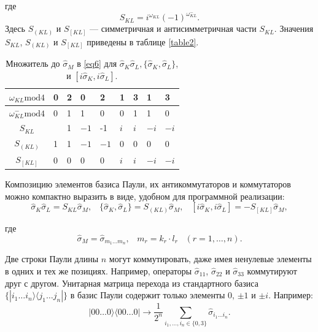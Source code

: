 \documentclass[a4paper]{report}
\begin{document}
где $$S_{KL} = i^{\omega_{KL}}(-1)^{\omega^-_{KL}}.$$
Здесь ${S_{(KL)}}$ и ${S_{[KL]}}$ — симметричная и антисимметричная части ${S_{KL}}$. Значения ${S_{KL}}$, ${S_{(KL)}}$ и ${S_{[KL]}}$ приведены в таблице \ref{table2}.

\begin{table}[h!]
    \centering
    \begin{tabular}{ | c | P{1cm} | P{1cm} | P{1cm} | P{1cm} | P{1cm} | P{1cm} | P{1cm} | P{1cm} | }
        \hline
        ${\omega_{KL}\mathrm{mod4}}$     & 0 & 2 & 0      & 2      & 1     & 3     & 1      & 3      \\
        \hline
        ${\omega_{KL}^{-}\mathrm{mod4}}$ & 0 & 1 & 1      & 0      & 0     & 1     & 1      & 0      \\
        \hline\hline
        ${S_{KL}}$                       &   & 1 & ${-1}$ & -1     & ${i}$ & ${i}$ & ${-i}$ & ${-i}$ \\
        \hline
        ${S_{(KL)}}$                     & 1 & 1 & ${-1}$ & ${-1}$ & 0     & 0     & 0      & 0      \\
        \hline
        ${S_{[KL]}}$                     & 0 & 0 & 0      & 0      & ${i}$ & ${i}$ & ${-i}$ & ${-i}$ \\
        \hline
    \end{tabular}
    \caption{Множитель до ${\hat{\sigma}_M}$ в \eqref{eq6} для ${\hat{\sigma}_K\hat{\sigma}_L,\{\hat{\sigma}_K,\hat{\sigma}_L\}}$, и ${[i\hat{\sigma}_K,i\hat{\sigma}_L]}$.}\label{table1}
\end{table}

Композицию элементов базиса Паули, их антикоммутаторов и коммутаторов можно компактно выразить в виде, удобном для программной реализации:
\begin{equation}\label{eq6}
    \hat{\sigma}_K\hat{\sigma}_L = S_{KL}\hat{\sigma}_M,\;\;\;
    \{\hat{\sigma}_K, \hat{\sigma}_L\} = S_{(KL)}\hat{\sigma}_M,\;\;\;
    [i\hat{\sigma}_K, i\hat{\sigma}_L] = -S_{[KL]}\hat{\sigma}_M,
\end{equation}

\noindent где
\begin{equation}\label{eq7}
    \hat{\sigma}_M = \hat{\sigma}_{m_1\ldots m_n}, \;\;\; m_r = k_r \cdot l_r \;\;\; (r = 1,\ldots,n).
\end{equation}

Две строки Паули длины ${n}$ могут коммутировать, даже имея ненулевые элементы в одних и тех же позициях. Например, операторы ${\hat{\sigma}_{11}}$, ${\hat{\sigma}_{22}}$ и ${\hat{\sigma}_{33}}$ коммутируют друг с другом. Унитарная матрица перехода из стандартного базиса ${\{|i_1\ldots i_n\rangle\langle j_1\ldots j_n|\}}$ в базис Паули содержит только элементы ${0}$, ${\pm 1}$ и ${\pm i}$. Например:
$$
|00\ldots0\rangle\langle00\ldots0| \rightarrow \frac{1}{2^n} \sum_{i_1,\ldots,i_n \in \{0,3\}} \hat{\sigma}_{i_1\ldots i_n}.
$$
\end{document}

